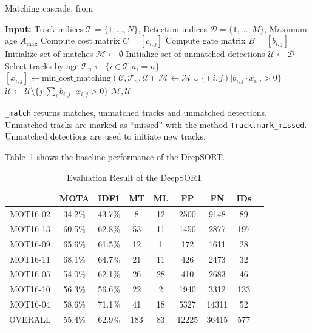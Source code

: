 \documentclass[conference]{IEEEtran}
\begin{document}
\begin{algorithm}[t]
    \caption{Matching cascade, from \cite{Wojke2018deep}}
    \label{alg:matching-cascade}
    \begin{algorithmic}[1]
        \Statex \textbf{Input:} Track indices $\mathcal{T} = \{1, \dots, N\}$, Detection indices $\mathcal{D} = \{1, \dots, M\}$, Maximum age $A_\textrm{max}$
        \State Compute cost matrix $C = [c_{i,j}]$
        \State Compute gate matrix $B = [b_{i,j}]$
        \State Initialize set of matches $\mathcal{M} \gets \emptyset$
        \State Initialize set of unmatched detections $\mathcal{U} \gets \mathcal{D}$
            \State Select tracks by age $\mathcal{T}_n \gets \{i \in \mathcal{T} | a_i = n\}$
            \State $[x_{i,j}] \gets \mathrm{min\_cost\_matching}(\mathcal{C}, \mathcal{T}_n, \mathcal{U})$
            \State $\mathcal{M} \gets \mathcal{M} \cup \{(i, j) | b_{i,j} \cdot x_{i,j} > 0\}$
            \State $\mathcal{U} \gets \mathcal{U} \setminus \{j | \sum_i b_{i,j} \cdot x_{i,j} > 0\}$
        \EndFor
        \State \Return $\mathcal{M}, \mathcal{U}$
    \end{algorithmic}
\end{algorithm}

\texttt{\_match} returns matches, unmatched tracks and unmatched detections. Unmatched tracks are marked as ``missed'' with the method \texttt{Track.mark\_missed}. Unmatched detections are used to initiate new tracks.

Table~\ref{tab:eval-deepsort} shows the baseline performance of the DeepSORT.

\begin{table}[h]
    \caption{Evaluation Result of the DeepSORT}
    \label{tab:eval-deepsort}
    \begin{tabular}{ccccccccc}
        \hline
        & MOTA & IDF1 & MT & ML & FP & FN & IDs\\\hline
        MOT16-02 & 34.2\% & 43.7\% & 8 & 12 & 2500 & 9148 & 89\\
        MOT16-13 & 60.5\% & 62.8\% & 53 & 11 & 1450 & 2877 & 197\\
        MOT16-09 & 65.6\% & 61.5\% & 12 & 1 & 172 & 1611 & 28\\
        MOT16-11 & 68.1\% & 64.7\% & 21 & 11 & 426 & 2473 & 32\\
        MOT16-05 & 54.0\% & 62.1\% & 26 & 28 & 410 & 2683 & 46\\
        MOT16-10 & 56.3\% & 56.6\% & 22 & 2 & 1940 & 3312 & 133\\
        MOT16-04 & 58.6\% & 71.1\% & 41 & 18 & 5327 & 14311 & 52\\
        OVERALL & 55.4\% & 62.9\% & 183 & 83 & 12225 & 36415 & 577\\\hline
\end{tabular}
\end{table}
\end{document}
